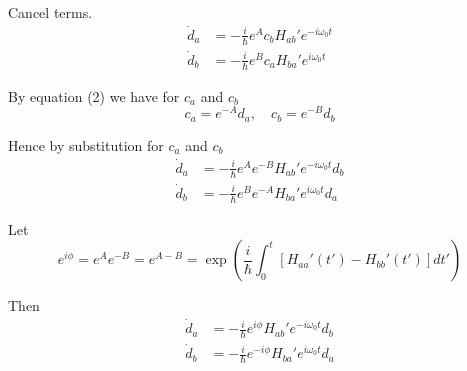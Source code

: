 Cancel terms.
\begin{align*}
\dot d_a&=-\frac{i}{\hbar}e^Ac_bH_{ab}'e^{-i\omega_0t}
\\
\dot d_b&=-\frac{i}{\hbar}e^Bc_aH_{ba}'e^{i\omega_0t}
\end{align*}

By equation (2) we have for $c_a$ and $c_b$
\begin{equation*}
c_a=e^{-A}d_a,\quad
c_b=e^{-B}d_b
\end{equation*}

Hence by substitution for $c_a$ and $c_b$
\begin{align*}
\dot d_a&=-\frac{i}{\hbar}e^Ae^{-B}H_{ab}'e^{-i\omega_0t}d_b
\\
\dot d_b&=-\frac{i}{\hbar}e^Be^{-A}H_{ba}'e^{i\omega_0t}d_a
\end{align*}

Let
\begin{equation*}
e^{i\phi}=e^Ae^{-B}=e^{A-B}
=\exp\left(\frac{i}{\hbar}\int_0^t\left[H_{aa}'(t')-H_{bb}'(t')\right]dt'\right)
\end{equation*}

Then
\begin{align*}
\dot d_a&=-\frac{i}{\hbar}e^{i\phi}H_{ab}'e^{-i\omega_0t}d_b
\\
\dot d_b&=-\frac{i}{\hbar}e^{-i\phi}H_{ba}'e^{i\omega_0t}d_a
\end{align*}


